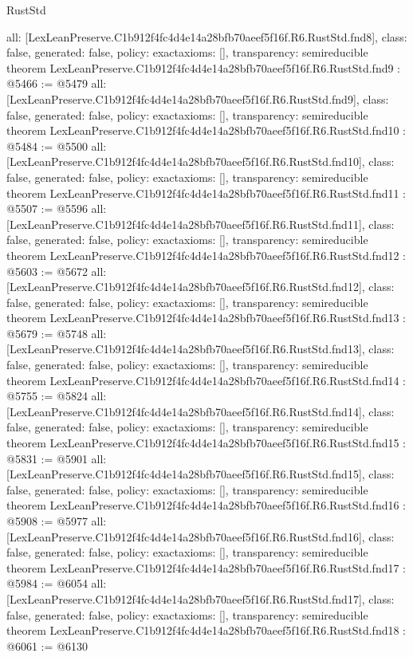 \begin{lexlean}{RustStd}
\begin{coremodule}
{  all: [LexLeanPreserve.C1b912f4fc4d4e14a28bfb70aeef5f16f.R6.RustStd.fnd8],
  class: false,
  generated: false,
  policy: exact{axioms: []},
  transparency: semireducible
}
theorem LexLeanPreserve.C1b912f4fc4d4e14a28bfb70aeef5f16f.R6.RustStd.fnd9 : @5466 := @5479 {
  all: [LexLeanPreserve.C1b912f4fc4d4e14a28bfb70aeef5f16f.R6.RustStd.fnd9],
  class: false,
  generated: false,
  policy: exact{axioms: []},
  transparency: semireducible
}
theorem LexLeanPreserve.C1b912f4fc4d4e14a28bfb70aeef5f16f.R6.RustStd.fnd10 : @5484 := @5500 {
  all: [LexLeanPreserve.C1b912f4fc4d4e14a28bfb70aeef5f16f.R6.RustStd.fnd10],
  class: false,
  generated: false,
  policy: exact{axioms: []},
  transparency: semireducible
}
theorem LexLeanPreserve.C1b912f4fc4d4e14a28bfb70aeef5f16f.R6.RustStd.fnd11 : @5507 := @5596 {
  all: [LexLeanPreserve.C1b912f4fc4d4e14a28bfb70aeef5f16f.R6.RustStd.fnd11],
  class: false,
  generated: false,
  policy: exact{axioms: []},
  transparency: semireducible
}
theorem LexLeanPreserve.C1b912f4fc4d4e14a28bfb70aeef5f16f.R6.RustStd.fnd12 : @5603 := @5672 {
  all: [LexLeanPreserve.C1b912f4fc4d4e14a28bfb70aeef5f16f.R6.RustStd.fnd12],
  class: false,
  generated: false,
  policy: exact{axioms: []},
  transparency: semireducible
}
theorem LexLeanPreserve.C1b912f4fc4d4e14a28bfb70aeef5f16f.R6.RustStd.fnd13 : @5679 := @5748 {
  all: [LexLeanPreserve.C1b912f4fc4d4e14a28bfb70aeef5f16f.R6.RustStd.fnd13],
  class: false,
  generated: false,
  policy: exact{axioms: []},
  transparency: semireducible
}
theorem LexLeanPreserve.C1b912f4fc4d4e14a28bfb70aeef5f16f.R6.RustStd.fnd14 : @5755 := @5824 {
  all: [LexLeanPreserve.C1b912f4fc4d4e14a28bfb70aeef5f16f.R6.RustStd.fnd14],
  class: false,
  generated: false,
  policy: exact{axioms: []},
  transparency: semireducible
}
theorem LexLeanPreserve.C1b912f4fc4d4e14a28bfb70aeef5f16f.R6.RustStd.fnd15 : @5831 := @5901 {
  all: [LexLeanPreserve.C1b912f4fc4d4e14a28bfb70aeef5f16f.R6.RustStd.fnd15],
  class: false,
  generated: false,
  policy: exact{axioms: []},
  transparency: semireducible
}
theorem LexLeanPreserve.C1b912f4fc4d4e14a28bfb70aeef5f16f.R6.RustStd.fnd16 : @5908 := @5977 {
  all: [LexLeanPreserve.C1b912f4fc4d4e14a28bfb70aeef5f16f.R6.RustStd.fnd16],
  class: false,
  generated: false,
  policy: exact{axioms: []},
  transparency: semireducible
}
theorem LexLeanPreserve.C1b912f4fc4d4e14a28bfb70aeef5f16f.R6.RustStd.fnd17 : @5984 := @6054 {
  all: [LexLeanPreserve.C1b912f4fc4d4e14a28bfb70aeef5f16f.R6.RustStd.fnd17],
  class: false,
  generated: false,
  policy: exact{axioms: []},
  transparency: semireducible
}
theorem LexLeanPreserve.C1b912f4fc4d4e14a28bfb70aeef5f16f.R6.RustStd.fnd18 : @6061 := @6130 {
}
\end{coremodule}
\end{lexlean}

